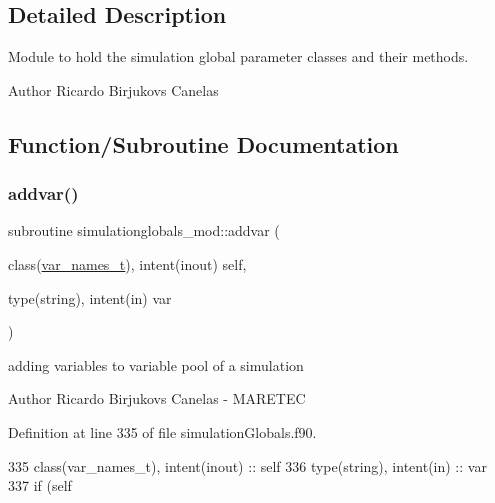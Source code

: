 \subsection{Detailed Description}
Module to hold the simulation global parameter classes and their methods. 

\begin{DoxyAuthor}{Author}
Ricardo Birjukovs Canelas 
\end{DoxyAuthor}


\subsection{Function/\+Subroutine Documentation}
\mbox{\label{namespacesimulationglobals__mod_afd372c5764a180f9029d4dc3cddce94d}} 
\subsubsection{\texorpdfstring{addvar()}{addvar()}}
{\footnotesize\ttfamily subroutine simulationglobals\+\_\+mod\+::addvar (\begin{DoxyParamCaption}\item[{class(\mbox{\hyperlink{structsimulationglobals__mod_1_1var__names__t}{var\+\_\+names\+\_\+t}}), intent(inout)}]{self,  }\item[{type(string), intent(in)}]{var }\end{DoxyParamCaption})\hspace{0.3cm}{\ttfamily [private]}}



adding variables to variable pool of a simulation 

\begin{DoxyAuthor}{Author}
Ricardo Birjukovs Canelas -\/ M\+A\+R\+E\+T\+EC 
\end{DoxyAuthor}


Definition at line 335 of file simulation\+Globals.\+f90.


\begin{DoxyCode}
335     \textcolor{keywordtype}{class}(var\_names\_t), \textcolor{keywordtype}{intent(inout)} :: self
336     \textcolor{keywordtype}{type}(string), \textcolor{keywordtype}{intent(in)} :: var
337     \textcolor{keywordflow}{if} (self%
\end{DoxyCode}
\mbox{\label{namespacesimulationglobals__mod_a20a4476e2a8dbec4c1aaa202a14b4a40}} 
